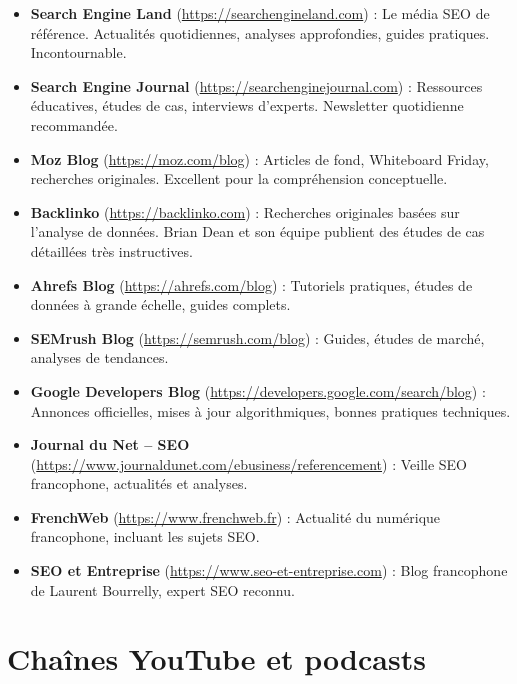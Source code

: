 \documentclass[12pt,a4paper,twoside]{report}
\begin{document}
\begin{itemize}
    \item \textbf{Search Engine Land} (\url{https://searchengineland.com}) : Le média SEO de référence. Actualités quotidiennes, analyses approfondies, guides pratiques. Incontournable.
    \item \textbf{Search Engine Journal} (\url{https://searchenginejournal.com}) : Ressources éducatives, études de cas, interviews d'experts. Newsletter quotidienne recommandée.
    \item \textbf{Moz Blog} (\url{https://moz.com/blog}) : Articles de fond, Whiteboard Friday, recherches originales. Excellent pour la compréhension conceptuelle.
    \item \textbf{Backlinko} (\url{https://backlinko.com}) : Recherches originales basées sur l'analyse de données. Brian Dean et son équipe publient des études de cas détaillées très instructives.
    \item \textbf{Ahrefs Blog} (\url{https://ahrefs.com/blog}) : Tutoriels pratiques, études de données à grande échelle, guides complets.
    \item \textbf{SEMrush Blog} (\url{https://semrush.com/blog}) : Guides, études de marché, analyses de tendances.
    \item \textbf{Google Developers Blog} (\url{https://developers.google.com/search/blog}) : Annonces officielles, mises à jour algorithmiques, bonnes pratiques techniques.
    \item \textbf{Journal du Net -- SEO} (\url{https://www.journaldunet.com/ebusiness/referencement}) : Veille SEO francophone, actualités et analyses.
    \item \textbf{FrenchWeb} (\url{https://www.frenchweb.fr}) : Actualité du numérique francophone, incluant les sujets SEO.
    \item \textbf{SEO et Entreprise} (\url{https://www.seo-et-entreprise.com}) : Blog francophone de Laurent Bourrelly, expert SEO reconnu.
\end{itemize}

\section*{Chaînes YouTube et podcasts}
\end{document}
